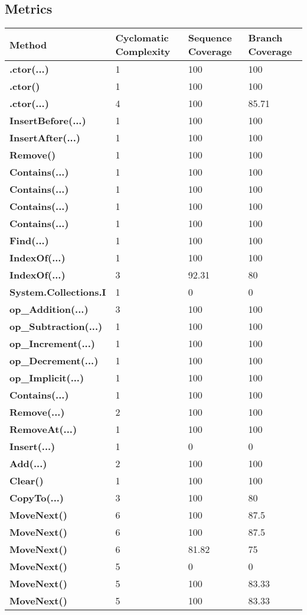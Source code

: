 \documentclass[a4paper,10pt]{article}
\begin{document}
\subsection{Metrics}
\begin{longtable}[l]{|l|l|l|l|}
\hline
\textbf{Method} & \textbf{Cyclomatic Complexity} & \textbf{Sequence Coverage} & \textbf{Branch Coverage}\\
\hline
\textbf{.ctor(...)} & 1 & 100 & 100\\
\hline
\textbf{.ctor()} & 1 & 100 & 100\\
\hline
\textbf{.ctor(...)} & 4 & 100 & 85.71\\
\hline
\textbf{InsertBefore(...)} & 1 & 100 & 100\\
\hline
\textbf{InsertAfter(...)} & 1 & 100 & 100\\
\hline
\textbf{Remove()} & 1 & 100 & 100\\
\hline
\textbf{Contains(...)} & 1 & 100 & 100\\
\hline
\textbf{Contains(...)} & 1 & 100 & 100\\
\hline
\textbf{Contains(...)} & 1 & 100 & 100\\
\hline
\textbf{Contains(...)} & 1 & 100 & 100\\
\hline
\textbf{Find(...)} & 1 & 100 & 100\\
\hline
\textbf{IndexOf(...)} & 1 & 100 & 100\\
\hline
\textbf{IndexOf(...)} & 3 & 92.31 & 80\\
\hline
\textbf{System.Collections.I} & 1 & 0 & 0\\
\hline
\textbf{op\_Addition(...)} & 3 & 100 & 100\\
\hline
\textbf{op\_Subtraction(...)} & 1 & 100 & 100\\
\hline
\textbf{op\_Increment(...)} & 1 & 100 & 100\\
\hline
\textbf{op\_Decrement(...)} & 1 & 100 & 100\\
\hline
\textbf{op\_Implicit(...)} & 1 & 100 & 100\\
\hline
\textbf{Contains(...)} & 1 & 100 & 100\\
\hline
\textbf{Remove(...)} & 2 & 100 & 100\\
\hline
\textbf{RemoveAt(...)} & 1 & 100 & 100\\
\hline
\textbf{Insert(...)} & 1 & 0 & 0\\
\hline
\textbf{Add(...)} & 2 & 100 & 100\\
\hline
\textbf{Clear()} & 1 & 100 & 100\\
\hline
\textbf{CopyTo(...)} & 3 & 100 & 80\\
\hline
\textbf{MoveNext()} & 6 & 100 & 87.5\\
\hline
\textbf{MoveNext()} & 6 & 100 & 87.5\\
\hline
\textbf{MoveNext()} & 6 & 81.82 & 75\\
\hline
\textbf{MoveNext()} & 5 & 0 & 0\\
\hline
\textbf{MoveNext()} & 5 & 100 & 83.33\\
\hline
\textbf{MoveNext()} & 5 & 100 & 83.33\\
\hline
\end{longtable}
\end{document}
